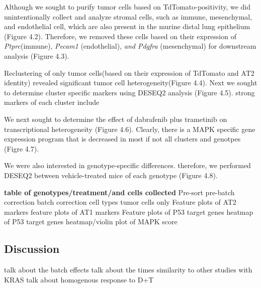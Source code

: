 Although we sought to purify tumor cells based on TdTomato-positivity, we did unintentionally collect and analyze stromal cells, such as immune, mesenchymal, and endothelial cell, which are also present in the murine distal lung epithelium (Figure 4.2). Therefore, we removed these cells based on their expression of \emph{Ptprc}(immune), \emph{Pecam1} (endothelial), \emph{and Pdgfra} (mesenchymal) for downstream analysis (Figure 4.3).

Reclustering of only tumor cells(based on their expression of TdTomato and AT2 identity) revealed significant tumor cell heterogeneity(Figure 4.4). Next we sought to determine cluster specific markers using DESEQ2 analysis (Figure 4.5). strong markers of each cluster include

We next sought to determine the effect of dabrafenib plus trametinib on transcriptional heterogeneity (Figure 4.6). Clearly, there is a MAPK specific gene expression program that is decreased in most if not all clusters and genotpes (Figre 4.7).

We were also interested in genotype-specific differences. therefore, we performed DESEQ2 between vehicle-treated mice of each genotype (Figure 4.8).

\textbf{table of genotypes/treatment/and cells collected}
Pre-sort
pre-batch correction
batch correction
cell types
tumor cells only
Feature plots of AT2 markers
feature plots of AT1 markers
Feature plots of P53 target genes
heatmap of P53 target genes
heatmap/violin plot of MAPK score

\hypertarget{discussion-2}{%
\subsection{Discussion}\label{discussion-2}}

talk about the batch effects
talk about the times
similarity to other studies with KRAS
talk about homogenous response to D+T

